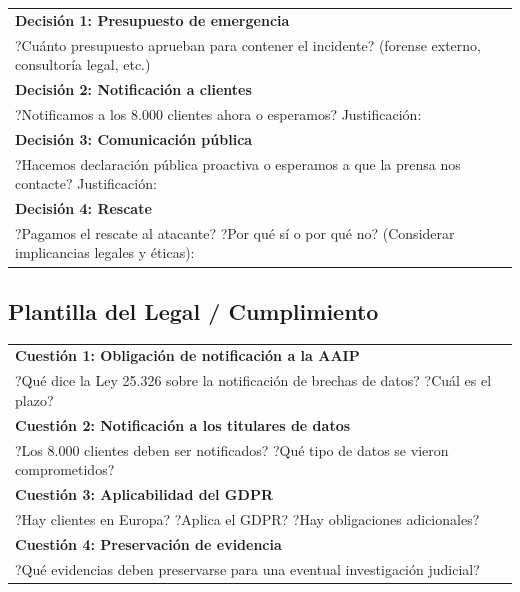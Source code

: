 \documentclass[12pt,a4paper]{article}
\renewcommand{\arraystretch}{1.25}
\begin{document}
\begin{cajaRolGerente}
\renewcommand{\arraystretch}{1.6}
\begin{tabularx}{\textwidth}{|X|}
\hline
\textbf{Decisi\'on 1: Presupuesto de emergencia}\\[2pt]
?Cu\'anto presupuesto aprueban para contener el incidente? (forense externo, consultor\'ia legal, etc.)\\[1.5cm]
\hline
\textbf{Decisi\'on 2: Notificaci\'on a clientes}\\[2pt]
?Notificamos a los 8.000 clientes ahora o esperamos? Justificaci\'on:\\[1.5cm]
\hline
\textbf{Decisi\'on 3: Comunicaci\'on p\'ublica}\\[2pt]
?Hacemos declaraci\'on p\'ublica proactiva o esperamos a que la prensa nos contacte? Justificaci\'on:\\[1.5cm]
\hline
\textbf{Decisi\'on 4: Rescate}\\[2pt]
?Pagamos el rescate al atacante? ?Por qu\'e s\'i o por qu\'e no? (Considerar implicancias legales y \'eticas):\\[1.5cm]
\hline
\end{tabularx}
\end{cajaRolGerente}

\newpage
\subsection{Plantilla del Legal / Cumplimiento}

\begin{cajaRolLegal}
\renewcommand{\arraystretch}{1.6}
\begin{tabularx}{\textwidth}{|X|}
\hline
\textbf{Cuesti\'on 1: Obligaci\'on de notificaci\'on a la AAIP}\\[2pt]
?Qu\'e dice la Ley 25.326 sobre la notificaci\'on de brechas de datos? ?Cu\'al es el plazo?\\[1.5cm]
\hline
\textbf{Cuesti\'on 2: Notificaci\'on a los titulares de datos}\\[2pt]
?Los 8.000 clientes deben ser notificados? ?Qu\'e tipo de datos se vieron comprometidos?\\[1.5cm]
\hline
\textbf{Cuesti\'on 3: Aplicabilidad del GDPR}\\[2pt]
?Hay clientes en Europa? ?Aplica el GDPR? ?Hay obligaciones adicionales?\\[1.5cm]
\hline
\textbf{Cuesti\'on 4: Preservaci\'on de evidencia}\\[2pt]
?Qu\'e evidencias deben preservarse para una eventual investigaci\'on judicial?\\[1.5cm]
\hline
\end{tabularx}
\end{cajaRolLegal}
\end{document}
